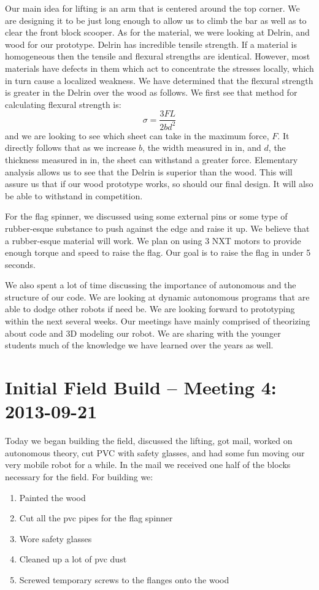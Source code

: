 \documentclass{article}
\begin{document}
Our main idea for lifting is an arm that is centered around the top corner. We are designing it to be just long enough to allow us to climb the bar as well as to clear the front block scooper. As for the material, we were looking at Delrin, and wood for our prototype. Delrin has incredible tensile strength. If a material is homogeneous then the tensile and flexural strengths are identical. However, most materials have defects in them which act to concentrate the stresses locally, which in turn cause a localized weakness. We have determined that the flexural strength is greater in the Delrin over the wood as follows. We first see that method for calculating flexural strength is: \[\sigma = \frac{3FL}{2bd^2}\] and we are looking to see which sheet can take in the maximum force, $F$. It directly follows that as we increase $b$, the width measured in in, and $d$, the  thickness measured in in, the sheet can withstand a greater force. Elementary analysis allows us to see that the Delrin is superior than the wood. This will assure us that if our wood prototype works, so should our final design. It will also be able to withstand in competition. 

For the flag spinner, we discussed using some external pins or some type of rubber-esque substance to push against the edge and raise it up. We believe that a rubber-esque material will work. We plan on using 3 NXT motors to provide enough torque and speed to raise the flag. Our goal is to raise the flag in under 5 seconds. 

We also spent a lot of time discussing the importance of autonomous and the structure of our code. We are looking at dynamic autonomous programs that are able to dodge other robots if need be. We are looking forward to prototyping within the next several weeks. Our meetings have mainly comprised of theorizing about code and 3D modeling our robot. We are sharing with the younger students much of the knowledge we have learned over the years as well. 

\newpage
\section{Initial Field Build -- Meeting 4: 2013-09-21}
Today we began building the field, discussed the lifting, got mail, worked on autonomous theory, cut PVC with safety glasses, and had some fun moving our very mobile robot for a while.  In the mail we received one half of the blocks necessary for the field.
For building we:
\begin{enumerate}
\item Painted the wood
\item Cut all the pvc pipes for the flag spinner
\item Wore safety glasses
\item Cleaned up a lot of pvc dust
\item Screwed temporary screws to the flanges onto the wood
\end{enumerate}
\end{document}
